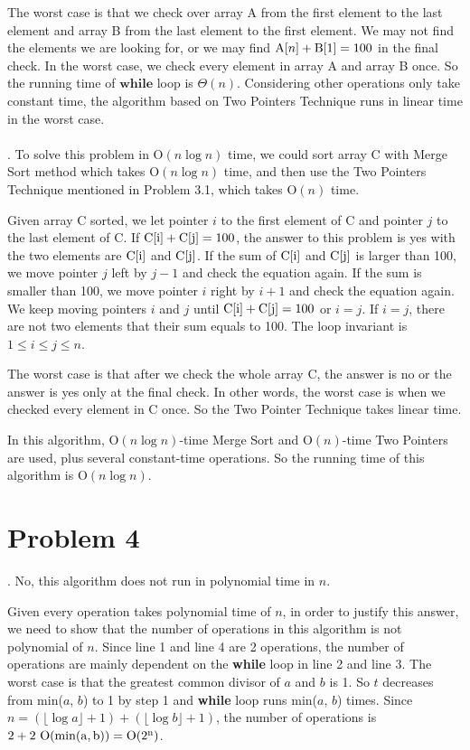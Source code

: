 \documentclass[twoside,11pt]{homework}
\begin{document}
The worst case is that we check over array A from the first element to the last element and array B from the last element  to the first element.
We may not find the elements we are looking for, or we may find $\mathrm{A}[n] + \rm{B}[1] = 100$ in the final check.
In the worst case,  we check every element in array A and array B once. 
So the running time of $\textbf{while}$ loop is $\Theta(n)$.
Considering other operations only take constant time, the algorithm based on Two Pointers Technique runs in linear time in the worst case.
\\\\

.
To solve this problem in $\mathrm{O} (n \log n)$ time, we could sort array C with Merge Sort method which takes $\mathrm{O} (n \log n)$ time, and then use the Two Pointers Technique mentioned in Problem 3.1, which takes $\mathrm{O} (n)$ time.

Given array C sorted, we let pointer $i$ to the first element of C and pointer $j$ to the last element of C. If $\rm{C}[i] + \rm{C}[j] = 100$, the answer to this problem is yes with the two elements are $\rm{C}[i]$ and $\rm{C}[j]$. 
If the sum of $\rm{C}[i]$ and $\rm{C}[j]$ is larger than 100, we move pointer $j$ left by $j - 1$ and check the equation again. 
If the sum is smaller than 100, we move pointer $i$ right by $i+1$ and check the equation again. 
We keep moving pointers $i$ and $j$ until $\rm{C}[i] + \rm{C}[j] =100$ or $i = j$. If $i =j$, there are not two elements that their sum equals to 100.
The loop invariant is $1 \le i \le j \le n$.

The worst case is that after we check the whole array C, the answer is no or the answer is yes only at the final check. In other words, the worst case is when we checked every element in C once. So the Two Pointer Technique takes linear time.

In this algorithm, $\mathrm{O}(n \log n)$-time Merge Sort and $\mathrm{O} (n)$-time Two Pointers are used, plus several constant-time operations. So the running time of this algorithm is $\mathrm{O} (n \log n)$.

\section*{Problem 4}
.
No, this algorithm does not run in polynomial time in $n$.

Given every operation takes polynomial time of $n$, in order to justify this answer, we need to show that the number of operations in this algorithm is not polynomial of $n$. Since line 1 and line 4 are 2 operations, the number of operations are mainly dependent on the  \textbf{while} loop in line 2 and line 3. The worst case is that the greatest common divisor of $a$ and $b$ is 1. So $t$ decreases from min($a$, $b$) to 1 by step 1 and \textbf{while} loop runs min($a$, $b$) times. Since  $n = (\lfloor \log a \rfloor + 1) + (\lfloor \log b \rfloor +1) $, the number of operations is $2 + 2\ \rm{O}(\rm{min}(a, b)) = \rm{O}(2^n)$.
\end{document}
